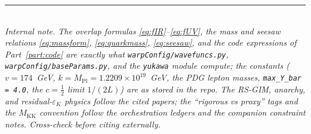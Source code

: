 \documentclass[11pt]{article}
\newcommand{\MKK}{M_{\mathrm{KK}}}
\newcommand{\half}{\tfrac{1}{2}}
\newcommand{\epsK}{\varepsilon_K}
\newcommand{\Mpl}{M_{\mathrm{Pl}}}
\newcommand{\code}[1]{\texttt{#1}}
\theoremstyle{definition}
\begin{document}
\bigskip
\noindent\rule{\linewidth}{0.4pt}\\
\footnotesize
\emph{Internal note. The overlap formulas \eqref{eq:fIR}--\eqref{eq:fUV}, the mass
and seesaw relations \eqref{eq:massform}, \eqref{eq:quarkmass}, \eqref{eq:seesaw},
and the code expressions of Part~\ref{part:code} are exactly what
\code{warpConfig/wavefuncs.py}, \code{warpConfig/baseParams.py}, and the
\code{yukawa} module compute; the constants ($v=174$~GeV, $k=\Mpl=1.2209\times
10^{19}$~GeV, the PDG lepton masses, \code{max\_Y\_bar = 4.0}, the $c=\half$ limit
$1/(2L)$) are as stored in the repo. The RS-GIM, anarchy, and residual-$\epsK$
physics follow the cited papers; the ``rigorous vs proxy'' tags and the $\MKK$
convention follow the orchestration ledgers and the companion constraint notes.
Cross-check before citing externally.}
\end{document}
